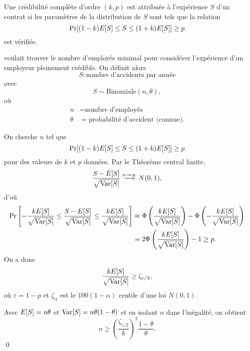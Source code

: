 \begin{definition}
  Une crédibilité complète d'ordre $(k, p)$ est attribuée à
  l'expérience $S$ d'un contrat si les paramètres de la distribution
  de $S$ sont tels que la relation
  \begin{displaymath}
    \Pr[(1 - k) E [ S ] \leq S \leq (1 + k) E [ S ]] \geq p
  \end{displaymath}
  est vérifiée.
\end{definition}

\begin{exemple}
  \cite{Mowbray:1914} voulait trouver le nombre d'employés minimal
  pour considérer l'expérience d'un employeur pleinement crédible. On
  définit alors
  \begin{displaymath}
    S: \text{nombre d'accidents par année}
  \end{displaymath}
  avec
  \begin{displaymath}
    S \sim \text{Binomiale}(n, \theta),
  \end{displaymath}
  où
  \begin{align*}
    n &= \text{nombre d'employés} \\
    \theta &= \text{probabilité d'accident (connue)}.
  \end{align*}

  On cherche $n$ tel que
  \begin{displaymath}
    \Pr[(1 - k) E [ S ] \leq S \leq (1 + k) E [ S ]] \geq p
  \end{displaymath}
  pour des valeurs de $k$ et $p$ données. Par le Théorème central
  limite,
  \begin{displaymath}
    \frac{S - E [ S ]}{\sqrt{\operatorname{Var} [ S ]}}
    \stackrel{n \rightarrow \infty}{\longrightarrow}
    N(0, 1),
  \end{displaymath}
  d'où
  \begin{align*}
    \Pr
    \left[
      - \frac{k E [ S ]}{\sqrt{\operatorname{Var} [ S ]}}
      \leq \frac{S - E [ S ]}{\sqrt{\operatorname{Var} [ S ]}} \leq
      \frac{k E [ S ]}{\sqrt{\operatorname{Var} [ S ]}}
    \right]
    &\approx
    \Phi
    \left(
      \frac{k E [ S ]}{\sqrt{\operatorname{Var} [ S ]}}
    \right) -
    \Phi
    \left(
      - \frac{k E [ S ]}{\sqrt{\operatorname{Var} [ S ]}}
    \right) \\
    &=
    2 \Phi
    \left(
      \frac{k E [ S ]}{\sqrt{\operatorname{Var} [ S ]}}
    \right) - 1 \geq p.
  \end{align*}
  On a donc
  \begin{displaymath}
    \frac{k E [ S ]}{\sqrt{\operatorname{Var} [ S ]}} \geq \zeta_{\varepsilon/2},
  \end{displaymath}
  où $\varepsilon = 1 - p$ et $\zeta_\alpha$ est le $100(1 -
  \alpha)${\ieme} centile d'une loi $N(0, 1)$.

  Avec $E [ S ] = n \theta$ et $\operatorname{Var} [ S ] = n \theta (1 - \theta)$ et en
  isolant $n$ dans l'inégalité, on obtient
  \begin{displaymath}
    n \geq
    \left(
      \frac{\zeta_{\varepsilon/2}}{k}
    \right)^2
    \frac{1 - \theta}{\theta}.
  \end{displaymath}
  \qed
\end{exemple}

